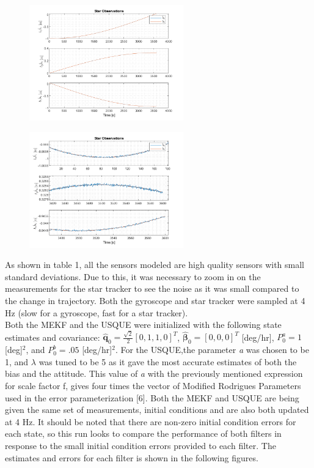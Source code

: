 \documentclass[12pt]{report}
\begin{document}
\begin{figure}[h!]
	\centering
	\begin{minipage}{.5\textwidth}
		\centering
		\includegraphics[height=5cm, keepaspectratio]{StarOutput.png}
		\label{fig:ex1}
	\end{minipage}%
	\begin{minipage}{.5\textwidth}
		\centering
		\includegraphics[height=5cm, keepaspectratio]{starnoise.png}
		\label{fig:ex2}
	\end{minipage}
\end{figure}


\noindent As shown in table 1, all the sensors modeled are high quality sensors with small standard deviations. Due to this, it was necessary to zoom in on the measurements for the star tracker to see the noise as it was small compared to the change in trajectory. Both the gyroscope and star tracker were sampled at 4 Hz (slow for a gyroscope, fast for a star tracker). \\

\noindent Both the MEKF and the USQUE were initialized with the following state estimates and covariance: $\pmb{\hat{q}}_0 = \frac{\sqrt{2}}{2}[0, 1, 1, 0]^T$, $\hat{\pmb{\beta}}_0 = [0, 0, 0]^T$ [deg/hr], $P_0^a = 1$ [deg]$^2$, and $P_0^b = .05$ [deg/hr]$^2$. For the USQUE,the parameter \textit{a} was chosen to be 1, and $\lambda$ was tuned to be 5 as it gave the most accurate estimates of both the bias and the attitude. This value of \textit{a} with the previously mentioned expression for scale factor f, gives four times the vector of Modified Rodrigues Parameters used in the error parameterization [6]. Both the MEKF and USQUE are being given the same set of measurements, initial conditions and are also both updated at 4 Hz. It should be noted that there are non-zero initial condition errors for each state, so this run looks to compare the performance of both filters in response to the small initial condition errors provided to each filter. The estimates and errors for each filter is shown in the following figures.
\end{document}
